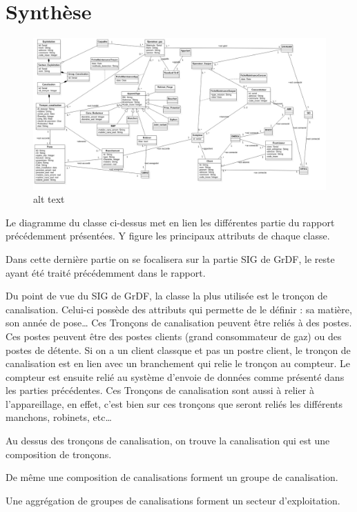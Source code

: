 \documentclass[
12pt,
french,                           %
a4paper,
]{article}
\begin{document}
\section{Synthèse}

\begin{figure}[htbp]
\centering
\includegraphics{D-Classe.jpg}
\caption{alt text}
\end{figure}

Le diagramme du classe ci-dessus met en lien les différentes partie du
rapport précédemment présentées. Y figure les principaux attributs de
chaque classe.

Dans cette dernière partie on se focalisera sur la partie SIG de GrDF,
le reste ayant été traité précédemment dans le rapport.

Du point de vue du SIG de GrDF, la classe la plus utilisée est le
tronçon de canalisation. Celui-ci possède des attributs qui permette de
le définir : sa matière, son année de pose\ldots{} Ces Tronçons de
canalisation peuvent être reliés à des postes. Ces postes peuvent être
des postes clients (grand consommateur de gaz) ou des postes de détente.
Si on a un client classque et pas un postre client, le tronçon de
canalisation est en lien avec un branchement qui relie le tronçon au
compteur. Le compteur est ensuite relié au système d'envoie de données
comme présenté dans les parties précédentes. Ces Tronçons de
canalisation sont aussi à relier à l'appareillage, en effet, c'est bien
sur ces tronçons que seront reliés les différents manchons, robinets,
etc\ldots{}

Au dessus des tronçons de canalisation, on trouve la canalisation qui
est une composition de tronçons.

De même une composition de canalisations forment un groupe de
canalisation.

Une aggrégation de groupes de canalisations forment un secteur
d'exploitation.
\end{document}
